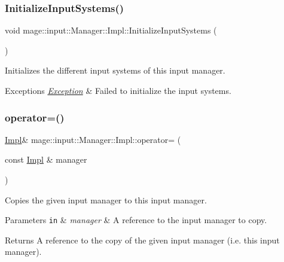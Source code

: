 \subsubsection{\texorpdfstring{Initialize\+Input\+Systems()}{InitializeInputSystems()}}
{\footnotesize\ttfamily void mage\+::input\+::\+Manager\+::\+Impl\+::\+Initialize\+Input\+Systems (\begin{DoxyParamCaption}{ }\end{DoxyParamCaption})\hspace{0.3cm}{\ttfamily [private]}}

Initializes the different input systems of this input manager.


\begin{DoxyExceptions}{Exceptions}
{\em \hyperlink{classmage_1_1_exception}{Exception}} & Failed to initialize the input systems. \\
\hline
\end{DoxyExceptions}
\hypertarget{classmage_1_1input_1_1_manager_1_1_impl_a1b60284e1656b2a864bb29580c7a0107}{}\label{classmage_1_1input_1_1_manager_1_1_impl_a1b60284e1656b2a864bb29580c7a0107} 
\subsubsection{\texorpdfstring{operator=()}{operator=()}\hspace{0.1cm}{\footnotesize\ttfamily [1/2]}}
{\footnotesize\ttfamily \hyperlink{classmage_1_1input_1_1_manager_1_1_impl}{Impl}\& mage\+::input\+::\+Manager\+::\+Impl\+::operator= (\begin{DoxyParamCaption}\item[{const \hyperlink{classmage_1_1input_1_1_manager_1_1_impl}{Impl} \&}]{manager }\end{DoxyParamCaption})\hspace{0.3cm}{\ttfamily [delete]}}

Copies the given input manager to this input manager.


\begin{DoxyParams}[1]{Parameters}
\mbox{\tt in}  & {\em manager} & A reference to the input manager to copy. \\
\hline
\end{DoxyParams}
\begin{DoxyReturn}{Returns}
A reference to the copy of the given input manager (i.\+e. this input manager). 
\end{DoxyReturn}
\hypertarget{classmage_1_1input_1_1_manager_1_1_impl_a0dcf4b3269e6cd96b9c5864663c86322}{}\label{classmage_1_1input_1_1_manager_1_1_impl_a0dcf4b3269e6cd96b9c5864663c86322} 
